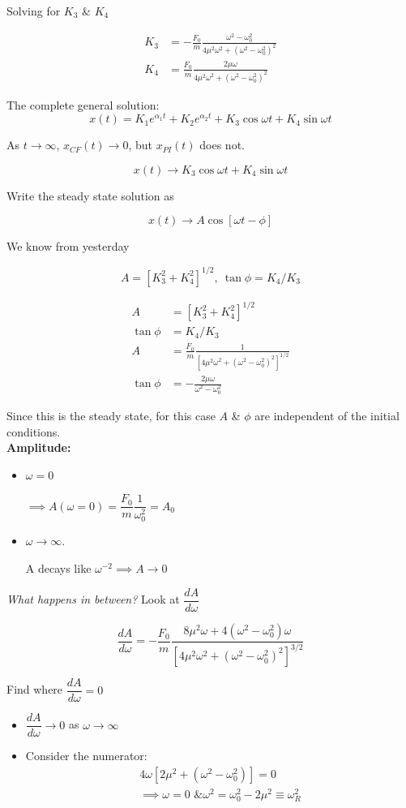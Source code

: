 \documentclass[10pt]{scrartcl}
\begin{document}
Solving for $K_3$ \& $K_4$

\[
\begin{aligned}
   K_3 &= -\frac{F_0}{m}\frac{\omega^2 - \omega_0^2}{4\mu^2\omega^2 + (\omega^2 - \omega_0^2)^2}\\
   K_4 &= \frac{F_0}{m}\frac{2\mu\omega}{4\mu^2\omega^2 + (\omega^2 - \omega_0^2)^2}  
\end{aligned}
\]

The complete general solution:
\[x(t) = K_1e^{\alpha_1t} + K_2e^{\alpha_2t} + K_3\cos\omega t + K_4\sin\omega t\]

As $t \to \infty$, $x_{CF}(t) \to 0$, but $x_{PI}(t)$ does not. 

\[x(t) \to K_3\cos\omega t + K_4\sin\omega t\]

Write the steady state solution as 

\[x(t) \to A\cos[\omega t - \phi]\]

We know from yesterday 

\[A = [K_3^2 + K_4^2]^{1/2},~\tan\phi = K_4/K_3\]

\[
\begin{aligned}
A &= [K_3^2 + K_4^2]^{1/2}\\
\tan\phi &= K_4/K_3\\
  A &= \frac{F_0}{m} \frac{1}{[4\mu^2\omega^2 + (\omega^2 - \omega_0^2)^2]^{1/2}}\\
  \tan\phi &= -\frac{2\mu\omega}{\omega^2-\omega_0^2}
\end{aligned}
\]

Since this is the steady state, for this case $A$ \& $\phi$ are independent of the initial conditions.\\

\textbf{Amplitude:}
\begin{itemize}
  \item $\omega = 0$
  
  $ \implies A(\omega = 0) = \dfrac{F_0}{m}\dfrac{1}{\omega_0^2} = A_0$
  \item $\omega \to \infty$. 
  
  A decays like $\omega^{-2} \implies A \to 0$
\end{itemize}

\emph{What happens in between?} Look at $\dfrac{dA}{d\omega}$

\[\frac{dA}{d\omega} = -\frac{F_0}{m}\frac{8\mu^2\omega + 4(\omega^2-\omega_0^2)\omega}{[4\mu^2\omega^2 + (\omega^2-\omega_0^2)^2]^{3/2}}\]

Find where $\dfrac{dA}{d\omega} = 0$
\begin{itemize}
  \item $\dfrac{dA}{d\omega} \to 0$ as $\omega \to \infty$
  \item Consider the numerator:
  \[
\begin{aligned}
  4\omega[2\mu^2 + (\omega^2 - \omega_0^2)] = 0\\
  \implies \omega = 0 \text{ \& } \omega^2 = \omega_0^2 - 2\mu^2 \equiv \omega_R^2
\end{aligned}
\]

\end{itemize}
\end{document}
